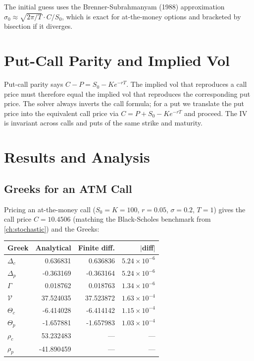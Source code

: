 The initial guess uses the Brenner-Subrahmanyam (1988) approximation
$\sigma_0 \approx \sqrt{2\pi / T} \cdot C / S_0$, which is exact for
at-the-money options and bracketed by bisection if it diverges.

\section{Put-Call Parity and Implied Vol}


Put-call parity says $C - P = S_0 - K e^{-rT}$. The implied vol that
reproduces a call price must therefore equal the implied vol that
reproduces the corresponding put price. The solver always inverts the
call formula; for a put we translate the put price into the equivalent
call price via $C = P + S_0 - K e^{-rT}$ and proceed. The IV is invariant
across calls and puts of the same strike and maturity.

\section{Results and Analysis}

\subsection{Greeks for an ATM Call}

Pricing an at-the-money call ($S_0 = K = 100$, $r = 0.05$, $\sigma = 0.2$,
$T = 1$) gives the call price $C = 10.4506$ (matching the Black-Scholes
benchmark from \cref{ch:stochastic}) and the Greeks:

\begin{center}
\begin{tabular}{lrrr}
\toprule
Greek & Analytical & Finite diff. & $|$diff$|$ \\
\midrule
$\Delta_c$ &  0.636831 &  0.636836 & $5.24 \times 10^{-6}$ \\
$\Delta_p$ & -0.363169 & -0.363164 & $5.24 \times 10^{-6}$ \\
$\Gamma$   &  0.018762 &  0.018763 & $1.34 \times 10^{-6}$ \\
$\mathcal{V}$ & 37.524035 & 37.523872 & $1.63 \times 10^{-4}$ \\
$\Theta_c$ & -6.414028 & -6.414142 & $1.15 \times 10^{-4}$ \\
$\Theta_p$ & -1.657881 & -1.657983 & $1.03 \times 10^{-4}$ \\
$\rho_c$   & 53.232483 & --- & --- \\
$\rho_p$   & -41.890459 & --- & --- \\
\bottomrule
\end{tabular}
\end{center}

